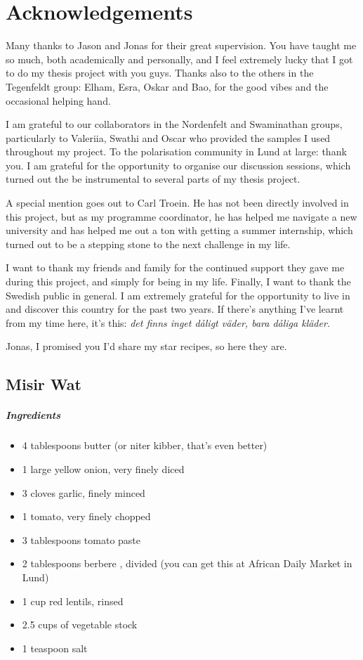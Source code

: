 \chapter{Acknowledgements}

Many thanks to Jason and Jonas for their great supervision. You have taught me so much, both academically and personally, and I feel extremely lucky that I got to do my thesis project with you guys. Thanks also to the others in the Tegenfeldt group: Elham, Esra, Oskar and Bao, for the good vibes and the occasional helping hand.

I am grateful to our collaborators in the Nordenfelt and Swaminathan groups, particularly to Valeriia, Swathi and Oscar who provided the samples I used throughout my project. To the polarisation community in Lund at large: thank you. I am grateful for the opportunity to organise our discussion sessions, which turned out the be instrumental to several parts of my thesis project.

A special mention goes out to Carl Troein. He has not been directly involved in this project, but as my programme coordinator, he has helped me navigate a new university and has helped me out a ton with getting a summer internship, which turned out to be a stepping stone to the next challenge in my life.

I want to thank my friends and family for the continued support they gave me during this project, and simply for being in my life. Finally, I want to thank the Swedish public in general. I am extremely grateful for the opportunity to live in and discover this country for the past two years. If there's anything I've learnt from my time here, it's this: \emph{det finns inget dåligt väder, bara dåliga kläder}.

\bigskip

\noindent Jonas, I promised you I'd share my star recipes, so here they are.

\section*{Misir Wat}

\paragraph{Ingredients}
\begin{itemize}
	\item 4 tablespoons butter (or niter kibber, that's even better)
	\item 1 large yellow onion, very finely diced
	\item 3 cloves garlic, finely minced
	\item 1 tomato, very finely chopped
	\item 3 tablespoons tomato paste
	\item 2 tablespoons berbere , divided (you can get this at African Daily Market in Lund)
	\item 1 cup red lentils, rinsed
	\item 2.5 cups of vegetable stock
	\item 1 teaspoon salt
\end{itemize}

